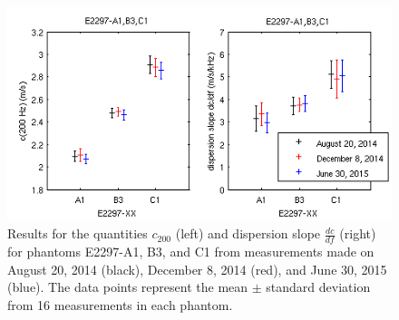 \begin{figure}[htb!]
    \centering
    \includegraphics[width=0.75\linewidth]{figs/phase2_longitudinal_stability.png}
    \caption{Results for the quantities $c_{200}$ (left) and dispersion slope
        $\frac{dc}{df}$ (right) for phantoms E2297-A1, B3, and C1 from
        measurements made on August 20, 2014 (black), December 8, 2014 (red),
        and June 30, 2015 (blue). The data points represent the mean $\pm$
        standard deviation from 16 measurements in each phantom.}
\label{fig:phase2_longitudinal_stability}
\end{figure}
